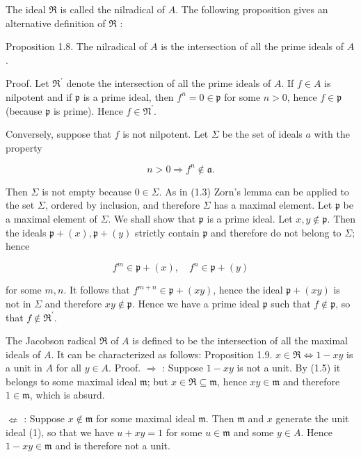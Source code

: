 \documentclass{standalone}
\theoremstyle{definition}
\theoremstyle{remark}
\begin{document}
The ideal $\mathfrak{R}$ is called the nilradical of $A$. The following proposition gives an alternative definition of $\mathfrak{R}$ :

Proposition 1.8. The nilradical of $A$ is the intersection of all the prime ideals of $A$.

Proof. Let $\mathfrak{R}^{\prime}$ denote the intersection of all the prime ideals of $A$. If $f \in A$ is nilpotent and if $\mathfrak{p}$ is a prime ideal, then $f^{n}=0 \in \mathfrak{p}$ for some $n>0$, hence $f \in \mathfrak{p}$ (because $\mathfrak{p}$ is prime). Hence $f \in \mathfrak{N}^{\prime}$.

Conversely, suppose that $f$ is not nilpotent. Let $\Sigma$ be the set of ideals $a$ with the property

\[
n>0 \Rightarrow f^{n} \notin \mathfrak{a} .
\]

Then $\Sigma$ is not empty because $0 \in \Sigma$. As in (1.3) Zorn's lemma can be applied to the set $\Sigma$, ordered by inclusion, and therefore $\Sigma$ has a maximal element. Let $\mathfrak{p}$ be a maximal element of $\Sigma$. We shall show that $\mathfrak{p}$ is a prime ideal. Let $x, y \notin \mathfrak{p}$. Then the ideals $\mathfrak{p}+(x), \mathfrak{p}+(y)$ strictly contain $\mathfrak{p}$ and therefore do not belong to $\Sigma$; hence

\[
f^{m} \in \mathfrak{p}+(x), \quad f^{n} \in \mathfrak{p}+(y)
\]

for some $m, n$. It follows that $f^{m+n} \in \mathfrak{p}+(x y)$, hence the ideal $\mathfrak{p}+(x y)$ is not in $\Sigma$ and therefore $x y \notin \mathfrak{p}$. Hence we have a prime ideal $\mathfrak{p}$ such that $f \notin \mathfrak{p}$, so that $f \notin \mathfrak{\mathfrak { R } ^ { \prime }}$.

The Jacobson radical $\Re$ of $A$ is defined to be the intersection of all the maximal ideals of $A$. It can be characterized as follows: Proposition 1.9. $x \in \Re \Leftrightarrow 1-x y$ is a unit in $A$ for all $y \in A$. Proof. $\Rightarrow$ : Suppose $1-x y$ is not a unit. By (1.5) it belongs to some maximal ideal $\mathfrak{m}$; but $x \in \mathfrak{R} \subseteq \mathfrak{m}$, hence $x y \in \mathfrak{m}$ and therefore $1 \in \mathfrak{m}$, which is absurd.

$\nLeftarrow$ : Suppose $x \notin \mathfrak{m}$ for some maximal ideal $\mathfrak{m}$. Then $\mathfrak{m}$ and $x$ generate the unit ideal (1), so that we have $u+x y=1$ for some $u \in \mathfrak{m}$ and some $y \in A$. Hence $1-x y \in \mathfrak{m}$ and is therefore not a unit.
\end{document}
